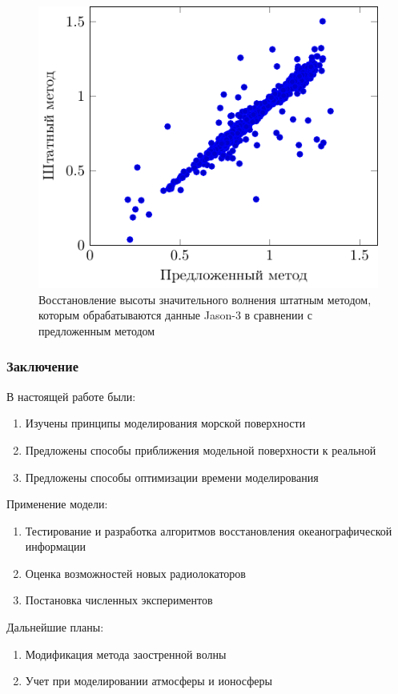 \documentclass[10pt,pdf,hyperref={unicode}, dvipsnames]{beamer}
\begin{document}
\begin{frame}[t]{}
    \begin{figure}[h]
        \centering
        \includegraphics[width=0.6\linewidth]{fig/retracking/compare}
        \caption{Восстановление высоты значительного волнения штатным методом,
        которым обрабатываются данные Jason-3 в сравнении с предложенным
    методом}
    \end{figure}
\end{frame}
\begin{frame}[t]
	\frametitle{Заключение}
	\vfill
    В настоящей работе были:
		\begin{enumerate}
			\item Изучены принципы моделирования морской поверхности

			\item Предложены способы приближения модельной поверхности к
                реальной

			\item Предложены способы оптимизации времени моделирования
		\end{enumerate}
		\vfill

    Применение модели:

	\begin{enumerate}
		\item Тестирование и разработка алгоритмов восстановления океанографической информации
		\item Оценка возможностей новых радиолокаторов
		\item Постановка численных экспериментов
	\end{enumerate}
	\vfill

    Дальнейшие планы: 
	\begin{enumerate}
		\item Модификация метода заостренной волны
        \item Учет при моделировании атмосферы и ионосферы
	\end{enumerate}
	\vfill
    
\end{frame}
\end{document}
